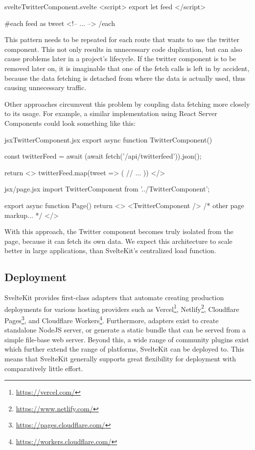 \begin{myminted}{svelte}{TwitterComponent.svelte}
<script>
    export let feed
</script>

{#each feed as tweet}
    <!-- ... -->
{/each}
\end{myminted}

This pattern needs to be repeated for each route that wants to use the twitter component. This not only results in unnecessary code duplication, but can also cause problems later in a project's lifecycle. If the twitter component is to be removed later on, it is imaginable that one of the fetch calls is left in by accident, because the data fetching is detached from where the data is actually used, thus causing unnecessary traffic.

Other approaches circumvent this problem by coupling data fetching more closely to its usage. For example, a similar implementation using React Server Components could look something like this:

\begin{myminted}{jsx}{TwitterComponent.jsx}
export async function TwitterComponent() {
    const twitterFeed = await (await fetch('/api/twitterfeed')).json();

    return <>
        {twitterFeed.map(tweet => (
            // ...
        ))}
    </>
}
\end{myminted}

\begin{myminted}{jsx}{/page.jsx}
import TwitterComponent from '../TwitterComponent';

export async function Page() {
    return <>
        <TwitterComponent />
        { /* other page markup... */ }
    </>
}
\end{myminted}

With this approach, the Twitter component becomes truly isolated from the page, because it can fetch its own data. We expect this architecture to scale better in large applications, than SvelteKit's centralized load function.


\subsection{Deployment}

SvelteKit provides first-class adapters that automate creating production deployments for various hosting providers such as Vercel\footnote{\url{https://vercel.com/}}, Netlify\footnote{\url{https://www.netlify.com/}}, Cloudflare Pages\footnote{\url{https://pages.cloudflare.com/}}, and Cloudflare Workers\footnote{\url{https://workers.cloudflare.com/}}. Furthermore, adapters exist to create standalone NodeJS server, or generate a static bundle that can be served from a simple file-base web server. Beyond this, a wide range of community plugins exist which further extend the range of platforms, SvelteKit can be deployed to. This means that SvelteKit generally supports great flexibility for deployment with comparatively little effort.  

